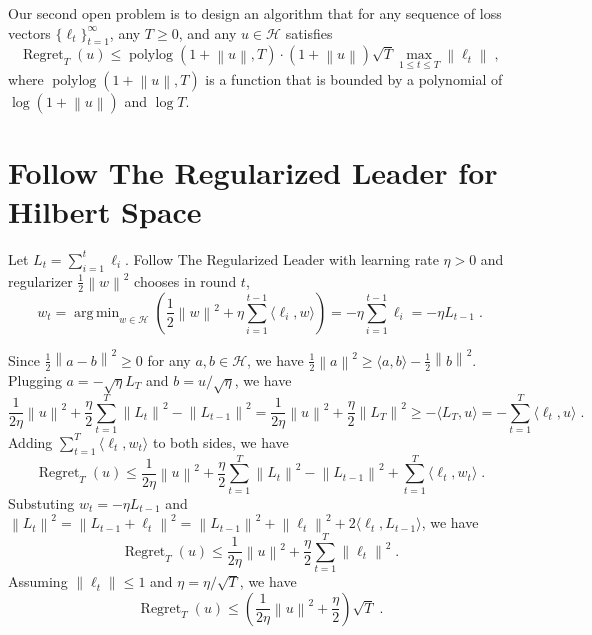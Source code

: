 \documentclass{colt2016} %
\DeclareMathOperator{\Regret}{Regret}
\DeclareMathOperator{\polylog}{polylog}
\renewcommand{\H}{\mathcal{H}}  %
\newcommand{\norm}[1]{\left\|{#1}\right\|}
\DeclareMathOperator*{\argmin}{arg\,min}
\begin{document}
Our second open problem is to design an algorithm that for any
sequence of loss vectors $\{\ell_t\}_{t=1}^\infty$, any $T \ge 0$,
and any $u \in \H$ satisfies
$$
\Regret_T(u) \le \polylog(1 + \norm{u}, T) \cdot (1 + \norm{u}) \sqrt{T} \max_{1 \le t \le T} \norm{\ell_t} \; ,
$$
where $\polylog(1 + \norm{u}, T)$ is a function that is bounded by a polynomial
of $\log(1 + \norm{u})$ and $\log T$.



\appendix

\section{Follow The Regularized Leader for Hilbert Space}

Let $L_t = \sum_{i=1}^t \ell_i$.
Follow The Regularized Leader with learning rate $\eta > 0$ and regularizer $\frac{1}{2}\norm{w}^2$
chooses in round $t$,
$$
w_t
= \argmin_{w \in \H} \left( \frac{1}{2}\norm{w}^2 + \eta \sum_{i=1}^{t-1} \langle \ell_i, w \rangle \right)
= - \eta \sum_{i=1}^{t-1} \ell_i = - \eta L_{t-1} \; .
$$

Since $\frac{1}{2}\norm{a-b}^2 \ge 0$ for any $a,b \in \H$, we have $\frac{1}{2}\norm{a}^2 \ge \langle a, b \rangle - \frac{1}{2}\norm{b}^2$.
Plugging $a = -\sqrt{\eta} L_T$ and $b = u/\sqrt{\eta}$, we have
$$
\frac{1}{2\eta} \norm{u}^2 + \frac{\eta}{2} \sum_{t=1}^T \norm{L_t}^2 - \norm{L_{t-1}}^2
= \frac{1}{2\eta} \norm{u}^2 + \frac{\eta}{2} \norm{L_T}^2  \ge - \langle L_T, u \rangle
= - \sum_{t=1}^T \langle \ell_t, u \rangle  \; .
$$
Adding $\sum_{t=1}^T \langle \ell_t, w_t \rangle$ to both sides, we have
$$
\Regret_T(u) \le \frac{1}{2\eta} \norm{u}^2 + \frac{\eta}{2} \sum_{t=1}^T \norm{L_t}^2 - \norm{L_{t-1}}^2 + \sum_{t=1}^T \langle \ell_t, w_t \rangle \; .
$$
Substuting $w_t = -\eta L_{t-1}$ and $\norm{L_{t}}^2 = \norm{L_{t-1} + \ell_t}^2 = \norm{L_{t-1}}^2 + \norm{\ell_t}^2 + 2 \langle \ell_t, L_{t-1} \rangle$,
we have
$$
\Regret_T(u) \le \frac{1}{2\eta} \norm{u}^2 + \frac{\eta}{2} \sum_{t=1}^T \norm{\ell_t}^2 \; .
$$
Assuming $\norm{\ell_t} \le 1$ and $\eta = \eta/\sqrt{T}$, we have
$$
\Regret_T(u) \le \left(\frac{1}{2\eta} \norm{u}^2 + \frac{\eta}{2} \right) \sqrt{T} \; .
$$
\end{document}
